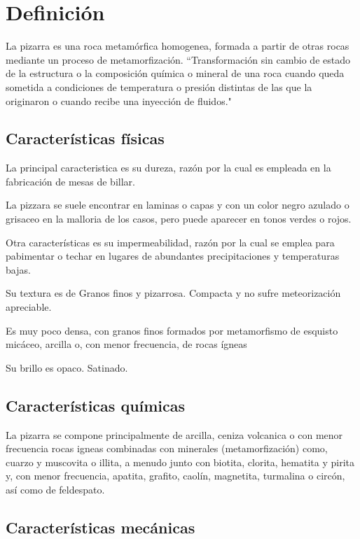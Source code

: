 \section {Definición}

	La pizarra es una roca metamórfica homogenea, formada a partir de otras rocas mediante un proceso de metamorfización. ``Transformación sin cambio de estado de la estructura o la composición química o mineral de una roca cuando queda sometida a condiciones de temperatura o presión distintas de las que la originaron o cuando recibe una inyección de fluidos."

	\subsection {Características físicas}
	La principal caracteristica es su dureza, razón por la cual es empleada en la fabricación de mesas de billar.

	La pizzara se suele encontrar en laminas o capas y con  un color negro azulado o grisaceo en la malloria de los casos, pero puede aparecer en tonos  verdes o rojos.

	Otra características es su impermeabilidad, razón por la cual se emplea para pabimentar o techar en lugares de abundantes precipitaciones y temperaturas bajas. 

Su textura es de Granos finos y pizarrosa. Compacta y no sufre meteorización apreciable.

Es muy poco densa, con granos finos formados por metamorfismo de esquisto micáceo, arcilla o, con menor frecuencia, de rocas ígneas

Su brillo es opaco. Satinado.

	\subsection {Características químicas}

La pizarra se compone principalmente de arcilla, ceniza volcanica o con menor frecuencia rocas igneas combinadas con minerales (metamorfización) como, cuarzo y muscovita o illita, a menudo junto con biotita, clorita, hematita y pirita y, con menor frecuencia, apatita, grafito, caolín, magnetita, turmalina o circón, así como de feldespato.

	\subsection {Características mecánicas}
 
